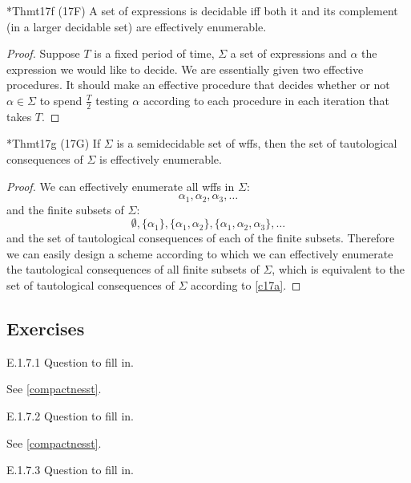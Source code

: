 \begin{reference}{*Thm}{t17f}
  (17F) A set of expressions is decidable iff both it and its complement (in a larger decidable set) are effectively enumerable.
\end{reference}

\begin{proof}
  Suppose $T$ is a fixed period of time, $\Sigma$ a set of expressions and $\alpha$ the expression we would like to decide. We are essentially given two effective procedures. It should make an effective procedure that decides whether or not $\alpha\in \Sigma$ to spend $\frac{T}{2}$ testing $\alpha$ according to each procedure in each iteration that takes $T$.
\end{proof}

\begin{reference}{*Thm}{t17g}
  (17G) If $\Sigma$ is a semidecidable set of wffs, then the set of tautological consequences of $\Sigma$ is effectively enumerable.
\end{reference}

\begin{proof}
  We can effectively enumerate all wffs in $\Sigma$:
  \[
    \alpha_1,\alpha_2,\alpha_3,\dots
  \]
  and the finite subsets of $\Sigma$:
  \[
    \emptyset,\{\alpha_1\},\{\alpha_1,\alpha_2\},\{\alpha_1,\alpha_2,\alpha_3\},\dots
  \]
  and the set of tautological consequences of each of the finite subsets. Therefore we can easily design a scheme according to which we can effectively enumerate the tautological consequences of all finite subsets of $\Sigma$, which is equivalent to the set of tautological consequences of $\Sigma$ according to \ref{c17a}.
\end{proof}

\subsection*{Exercises}

\begin{exercise}{E.1.7.1}
  Question to fill in.
\end{exercise}

See \ref{compactnesst}.

\begin{exercise}{E.1.7.2}
  Question to fill in.
\end{exercise}

See \ref{compactnesst}.

\begin{exercise}{E.1.7.3}
  Question to fill in.
\end{exercise}

